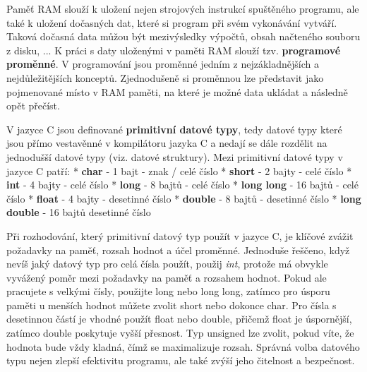Paměť RAM slouží k uložení nejen strojových instrukcí spuštěného programu, ale také k uložení dočasných dat, které si program při svém vykonávání vytváří. Taková dočasná data můžou být mezivýsledky výpočtů, obsah načteného souboru z disku, ... K práci s daty uloženými v paměti RAM slouží tzv. {\bf programové proměnné}. V programování jsou proměnné jedním z nejzákladnějších a nejdůležitějších konceptů. Zjednodušeně si proměnnou lze představit jako pojmenované místo v RAM paměti, na které je možné data ukládat a následně opět přečíst. 




V jazyce C jsou definované {\bf primitivní datové typy}, tedy datové typy které jsou přímo vestavěnné v kompilátoru jazyka C a nedají se dále rozdělit na jednodušší datové typy (viz. datové struktury). Mezi primitivní datové typy v jazyce C patří:
\begitems
* {\bf char} - 1 bajt - znak / celé číslo
* {\bf short} - 2 bajty - celé číslo
* {\bf int} - 4 bajty - celé číslo
* {\bf long} - 8 bajtů - celé číslo
* {\bf long long} - 16 bajtů - celé číslo 
* {\bf float} - 4 bajty - desetinné číslo
* {\bf double} - 8 bajtů - desetinné číslo
* {\bf long double} - 16 bajtů desetinné číslo  
\enditems

Při rozhodování, který primitivní datový typ použít v jazyce C, je klíčové zvážit požadavky na paměť, rozsah hodnot a účel proměnné. Jednoduše řeščeno, když nevíš jaký datový typ pro celá čísla použít, použij {\it int}, protože má obvykle vyvážený poměr mezi požadavky na paměť a rozsahem hodnot. Pokud ale pracujete s velkými čísly, použijte long nebo long long, zatímco pro úsporu paměti u menších hodnot můžete zvolit short nebo dokonce char. Pro čísla s desetinnou částí je vhodné použít float nebo double, přičemž float je úspornější, zatímco double poskytuje vyšší přesnost. Typ unsigned lze zvolit, pokud víte, že hodnota bude vždy kladná, čímž se maximalizuje rozsah. Správná volba datového typu nejen zlepší efektivitu programu, ale také zvýší jeho čitelnost a bezpečnost.




